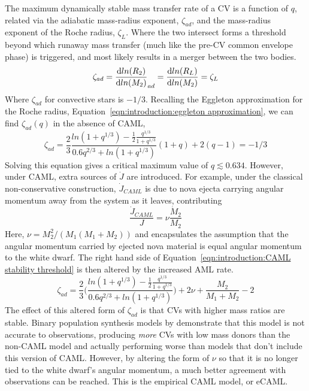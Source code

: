 The maximum dynamically stable mass transfer rate of a CV is a function of $q$, related via the adiabatic mass-radius exponent, $\zeta_{ad}$, and the mass-radius exponent of the Roche radius, $\zeta_{L}$. Where the two intersect forms a threshold beyond which runaway mass transfer (much like the pre-CV common envelope phase) is triggered, and most likely results in a merger between the two bodies.
\begin{equation}
    \label{eqn:introduction:CAML stability threshold}
    \zeta_{ad} = \frac{{\rm d} ln(R_2)}{{\rm d} ln(M_2)}_{ad} = \frac{{\rm d} ln(R_L)}{{\rm d} ln(M_2)} = \zeta_L
\end{equation}
Where $\zeta_{ad}$ for convective stars is $-1/3$. Recalling the Eggleton approximation for the Roche radius, Equation~\ref{eqn:introduction:eggleton approximation}, we can find $\zeta_{ad}(q)$ \citep{Schreiber2016} in the absence of CAML,
\begin{equation}
    \zeta_{ad} = \frac{2}{3}\frac{ln(1+q^{1/3}) - \frac{1}{2}\frac{q^{1/3}}{1+q^{1/3}}}{0.6q^{2/3} + ln(1+q^{1/3})} (1 + q) + 2(q - 1) = -1/3
\end{equation}
Solving this equation gives a critical maximum value of $q \lesssim 0.634$. However, under CAML, extra sources of $\dot J$ are introduced. For example, under the classical non-conservative construction, $\dot J_{CAML}$ is due to nova ejecta carrying angular momentum away from the system as it leaves, contributing
\begin{equation}
    \frac{\dot J_{CAML}}{J} = \nu \frac{\dot M_2}{M_2}
\end{equation}
Here, $\nu = M_2^2 / (M_1(M_1 + M_2))$ and encapsulates the assumption that the angular momentum carried by ejected nova material is equal angular momentum to the white dwarf.
The right hand side of Equation~\ref{eqn:introduction:CAML stability threshold} is then altered by the increased AML rate.
\begin{equation}
    \zeta_{ad} = \frac{2}{3} \Bigg( \frac{ln(1+q^{1/3}) - \frac{1}{2}\frac{q^{1/3}}{1+q^{1/3}}}{0.6q^{2/3} + ln(1+q^{1/3})} \Bigg) + 2\nu + \frac{M_2}{M_1 + M_2} - 2
\end{equation}
The effect of this altered form of $\zeta_{ad}$ is that CVs with higher mass ratios are stable. Binary population synthesis models by \citet{Schreiber2016} demonstrate that this model is not accurate to observations, producing {\it more} CVs with low mass donors than the non-CAML model and actually performing worse than models that don't include this version of CAML. However, by altering the form of $\nu$ so that it is no longer tied to the white dwarf's angular momentum, a much better agreement with observations can be reached. This is the empirical CAML model, or eCAML.

